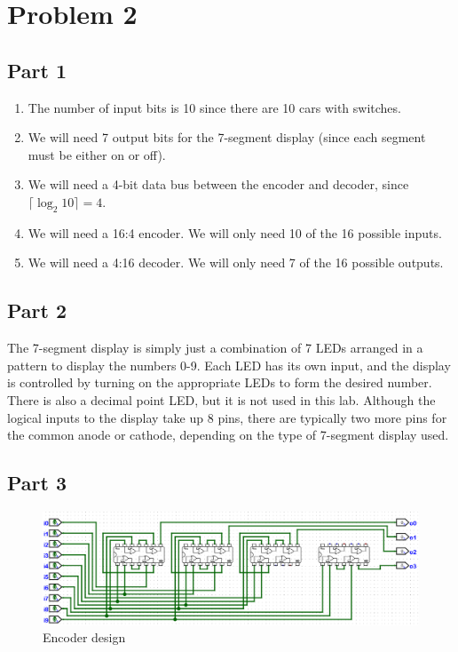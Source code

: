 \documentclass{article}
\begin{document}
\newpage
\section{Problem 2}

\subsection{Part 1}
\begin{enumerate}[label=\alph*.]
    \item The number of input bits is 10 since there are 10 cars with switches.
    \item We will need 7 output bits for the 7-segment display (since each segment must be either on or off).
    \item We will need a 4-bit data bus between the encoder and decoder, since $\lceil \log_2 10 \rceil = 4$.
    \item We will need a 16:4 encoder. We will only need 10 of the 16 possible inputs.
    \item We will need a 4:16 decoder. We will only need 7 of the 16 possible outputs.
\end{enumerate}

\subsection{Part 2}
The 7-segment display is simply just a combination of 7 LEDs arranged in a pattern to display the numbers 0-9.
Each LED has its own input, and the display is controlled by turning on the appropriate LEDs to form the desired number.
There is also a decimal point LED, but it is not used in this lab.
Although the logical inputs to the display take up 8 pins, there are typically two more pins for the common anode or cathode, depending on the type of 7-segment display used.

\subsection{Part 3}
\begin{figure}[H]
    \centering
    \includegraphics[width=\textwidth]{./images/encoder.png}
    \caption{Encoder design}
\end{figure}
\end{document}
